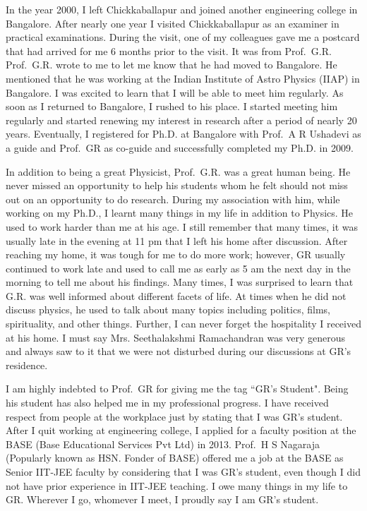 In the year 2000, I left Chickkaballapur and joined another engineering college in Bangalore. After nearly one year I visited Chickkaballapur as an examiner in practical examinations. During the visit, one of my colleagues gave me a postcard that had arrived for me 6 months prior to the visit. It was from Prof.\ G.R.  Prof.\ G.R. wrote to me to let me know that he had moved to Bangalore. He mentioned that he was working at the Indian Institute of Astro Physics (IIAP) in Bangalore. I was excited to learn that I will be able to meet him regularly. As soon as I returned to Bangalore, I rushed to his place. I started meeting him regularly and started renewing my interest in research after a period of nearly 20 years. Eventually, I registered for Ph.D. at Bangalore with Prof.\ A R Ushadevi as a guide and Prof.\ GR as co-guide and successfully completed my Ph.D. in 2009. 

In addition to being a great Physicist, Prof.\ G.R. was a great human being. He never missed an opportunity to help his students whom he felt should not miss out on an opportunity to do research. During my association with him, while working on my Ph.D., I learnt many things in my life in addition to Physics. He used to work harder than me at his age. I still remember that many times, it was usually late in the evening at 11 pm that I left his home after discussion. After reaching my home, it was tough for me to do more work; however, GR usually continued to work late and used to call me as early as 5 am the next day in the morning to tell me about his findings. Many times, I was surprised to learn that G.R. was well informed about different facets of life. At times when he did not discuss physics, he used to talk about many topics including politics, films, spirituality, and other things. Further, I can never forget the hospitality I received at his home. I must say Mrs. Seethalakshmi Ramachandran was very generous and always saw to it that we were not disturbed during our discussions at GR's residence.

I am highly indebted to Prof.\ GR for giving me the tag ``GR's Student". Being his student has also helped me in my professional progress. I have received respect from people at the workplace just by stating that I was GR's student. After I quit working at engineering college, I applied for a faculty position at the BASE (Base Educational Services Pvt Ltd) in 2013. Prof.\ H S Nagaraja (Popularly known as HSN. Fonder of BASE) offered me a job at the BASE as Senior IIT-JEE faculty by considering that I was GR's student, even though I did not have prior experience in IIT-JEE teaching. I owe many things in my life to GR. Wherever I go, whomever I meet, I proudly say I am GR's student. 

